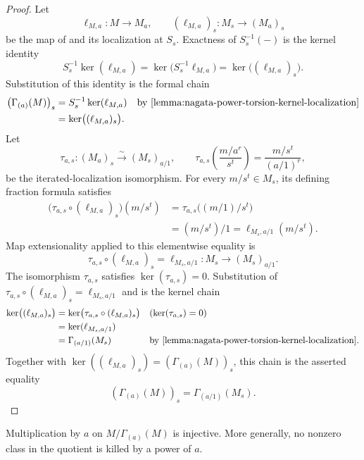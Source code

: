 \begin{proof}
  Let
  \[
    \ell_{M,a}\colon M\to M_a,
    \qquad
    (\ell_{M,a})_s\colon M_s\to(M_a)_s
  \]
  be the map of  and its
  localization at $S_s$.  Exactness of $S_s^{-1}(-)$ is the kernel identity
  \[
    S_s^{-1}\ker(\ell_{M,a})
      =\ker\bigl(S_s^{-1}\ell_{M,a}\bigr)
      =\ker\bigl((\ell_{M,a})_s\bigr).
  \]
  Substitution of this identity is the formal chain
  \[
  \begin{aligned}
    \bigl(\Gamma_{(a)}(M)\bigr)_s
      &=S_s^{-1}\ker(\ell_{M,a})
        &&\text{by \Cref{lemma:nagata-power-torsion-kernel-localization}}\\
      &=\ker\bigl((\ell_{M,a})_s\bigr).
  \end{aligned}
  \]
  Let
  \[
    \tau_{a,s}\colon(M_a)_s\xrightarrow{\sim}(M_s)_{a/1},
    \qquad
    \tau_{a,s}\!\left(\frac{m/a^r}{s^t}\right)
       =\frac{m/s^t}{(a/1)^r},
  \]
  be the iterated-localization isomorphism.  For every $m/s^t\in M_s$, its
  defining fraction formula satisfies
  \[
  \begin{aligned}
    \bigl(\tau_{a,s}\circ(\ell_{M,a})_s\bigr)(m/s^t)
      &=\tau_{a,s}\bigl((m/1)/s^t\bigr)\\
      &=(m/s^t)/1
       =\ell_{M_s,a/1}(m/s^t).
  \end{aligned}
  \]
  Map extensionality applied to this elementwise equality is
  \[
    \tau_{a,s}\circ(\ell_{M,a})_s
      =\ell_{M_s,a/1}\colon M_s\longrightarrow(M_s)_{a/1}.
  \]
  The isomorphism $\tau_{a,s}$ satisfies
  $\ker(\tau_{a,s})=0$.  Substitution of
  $\tau_{a,s}\circ(\ell_{M,a})_s=\ell_{M_s,a/1}$ and
   is the kernel chain
  \[
  \begin{aligned}
    \ker\bigl((\ell_{M,a})_s\bigr)
      &=\ker\bigl(\tau_{a,s}\circ(\ell_{M,a})_s\bigr)
        &&(\ker(\tau_{a,s})=0)\\
      &=\ker(\ell_{M_s,a/1})\\
      &=\Gamma_{(a/1)}(M_s)
        &&\text{by \Cref{lemma:nagata-power-torsion-kernel-localization}}.
  \end{aligned}
  \]
  Together with
  $\ker((\ell_{M,a})_s)=(\Gamma_{(a)}(M))_s$, this chain is the asserted
  equality
  \[
    (\Gamma_{(a)}(M))_s=\Gamma_{(a/1)}(M_s).
  \]
\end{proof}

\begin{lemma}
  \label{lemma:nagata-power-torsion-quotient-torsionfree}

  Multiplication by $a$ on $M/\Gamma_{(a)}(M)$ is injective.  More generally,
  no nonzero class in the quotient is killed by a power of $a$.
\end{lemma}

